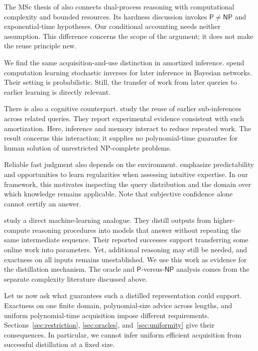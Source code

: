 \documentclass[11pt,a4paper]{article}
\numberwithin{equation}{section}
\newcommand{\Pclass}{\mathsf{P}}
\newcommand{\NPclass}{\mathsf{NP}}
\theoremstyle{plain}
\theoremstyle{definition}
\theoremstyle{remark}
\begin{document}
The MSc thesis of \citet{riedmiller2025dual} also connects dual-process reasoning with computational complexity and bounded resources. Its hardness discussion invokes $\Pclass\neq\NPclass$ and exponential-time hypotheses. Our conditional accounting needs neither assumption. This difference concerns the scope of the argument; it does not make the reuse principle new.

We find the same acquisition-and-use distinction in amortized inference. \citet{stuhlmuller2013} spend computation learning stochastic inverses for later inference in Bayesian networks. Their setting is probabilistic. Still, the transfer of work from later queries to earlier learning is directly relevant.

There is also a cognitive counterpart. \citet{gershman2014} study the reuse of earlier sub-inferences across related queries. They report experimental evidence consistent with such amortization. Here, inference and memory interact to reduce repeated work. The result concerns this interaction; it supplies no polynomial-time guarantee for human solution of unrestricted NP-complete problems.

Reliable fast judgment also depends on the environment. \citet{kahneman2009} emphasize predictability and opportunities to learn regularities when assessing intuitive expertise. In our framework, this motivates inspecting the query distribution and the domain over which knowledge remains applicable. Note that subjective confidence alone cannot certify an answer.

\citet{yu2024} study a direct machine-learning analogue. They distill outputs from higher-compute reasoning procedures into models that answer without repeating the same intermediate sequence. Their reported successes support transferring some online work into parameters. Yet, additional reasoning may still be needed, and exactness on all inputs remains unestablished. We use this work as evidence for the distillation mechanism. The oracle and $\Pclass$-versus-$\NPclass$ analysis comes from the separate complexity literature discussed above.

Let us now ask what guarantees such a distilled representation could support. Exactness on one finite domain, polynomial-size advice across lengths, and uniform polynomial-time acquisition impose different requirements. Sections~\ref{sec:restriction}, \ref{sec:oracles}, and~\ref{sec:uniformity} give their consequences. In particular, we cannot infer uniform efficient acquisition from successful distillation at a fixed size.
\end{document}
